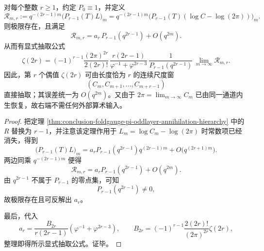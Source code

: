 \begin{theorem}\label{thm:conclusion-foldgauge-even-zeta-finite-window-extraction}
对每个整数 \(r\ge 1\)，约定 \(P_0\equiv 1\)，并定义
\[
\mathcal R_{m,r}
:=
q^{-(2r-1)m}
\bigl(P_{r-1}(T)L\bigr)_m
=
q^{-(2r-1)m}
\bigl(P_{r-1}(T)(\log C-\log(2\pi))\bigr)_m.
\]
则极限存在，且满足
\[
\mathcal R_{m,r}
=
a_r\,P_{r-1}(q^{2r-1})
+
O(q^{2m}).
\]
从而有显式抽取公式
\[
\zeta(2r)
=
(-1)^{r-1}
\frac{(2\pi)^{2r}}{2(2r)!}\,
\frac{r(2r-1)}{\varphi^{-1}+\varphi^{2r-3}}\,
\frac{1}{P_{r-1}(q^{2r-1})}\,
\lim_{m\to\infty}\mathcal R_{m,r}.
\]
因此，第 \(r\) 个偶值 \(\zeta(2r)\) 可由长度恰为 \(r\) 的连续尺度窗
\[
(C_m,C_{m+1},\dots,C_{m+r-1})
\]
直接抽取；其误差统一为 \(O(q^{2m})\)。又由于 \(2\pi=\lim_{m\to\infty}C_m\) 已由同一通道内生恢复，故右端不需任何外部算术输入。
\end{theorem}
\begin{proof}
把定理 \ref{thm:conclusion-foldgauge-pi-oddlayer-annihilation-hierarchy} 中的 \(R\) 替换为 \(r-1\)，并注意该定理作用于 \(L_m=\log C_m-\log(2\pi)\) 时常数项已经消失，得到
\[
\bigl(P_{r-1}(T)L\bigr)_m
=
a_r P_{r-1}(q^{2r-1})q^{(2r-1)m}
+
O\!\bigl(q^{(2r+1)m}\bigr).
\]
两边同乘 \(q^{-(2r-1)m}\) 便得
\[
\mathcal R_{m,r}
=
a_r P_{r-1}(q^{2r-1})+O(q^{2m}).
\]
由 \(q^{2r-1}\) 不属于 \(P_{r-1}\) 的零点集，可知
\[
P_{r-1}(q^{2r-1})\neq 0,
\]
故极限存在且可反解出 \(a_r\)。

最后，代入
\[
a_r=
\frac{B_{2r}}{r(2r-1)}(\varphi^{-1}+\varphi^{2r-3}),
\qquad
B_{2r}=(-1)^{r-1}\frac{2(2r)!}{(2\pi)^{2r}}\zeta(2r),
\]
整理即得所示显式抽取公式。证毕。
\end{proof}

